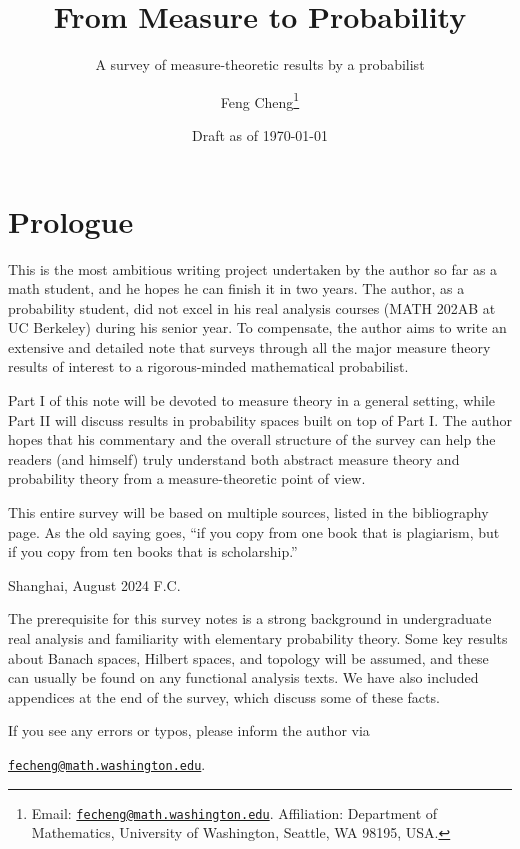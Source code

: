 \documentclass[10pt]{book}
\title{From Measure to Probability}
\subtitle{A survey of measure-theoretic results by a probabilist}
\author{Feng Cheng\thanks{Email: \href{mailto:fecheng@uw.edu}{\texttt{fecheng@math.washington.edu}}. Affiliation: Department of Mathematics, University of Washington, Seattle, WA 98195, USA.}}
\date{Draft as of \today}
\makeatletter
\numberwithin{equation}{chapter}
\theoremstyle{plain-star}
\theoremstyle{definition-star}
\theoremstyle{remark-star}
\theoremstyle{plain-star}
\let\@subtitle\@empty %
\renewcommand{\maketitle}{%
    \begin{titlepage}
    \renewcommand\thefootnote{\@fnsymbol\c@footnote}
    \let\footnotesize\small
    \let\footnoterule\relax
    \let \footnote \thanks
    \null\vfil
    \vskip 60\p@
    \begin{center}%
        {\LARGE \@title \par}%
        \vskip .5em%
        {\large \@subtitle \par}%
        \vskip 3em%
        {\large
        \lineskip .75em%
        \begin{tabular}[t]{c}%
            \@author
        \end{tabular}\par}%
        \vskip .75em%
        {\large \@date \par}%
    \end{center}\par
    \@thanks
    \vfil\null
    \end{titlepage}%
    \setcounter{footnote}{0}%
    \global\let\thanks\relax
    \global\let\maketitle\relax
    \global\let\@thanks\@empty
    \global\let\@author\@empty
    \global\let\@date\@empty
    \global\let\@title\@empty
    \global\let\title\relax
    \global\let\author\relax
    \global\let\date\relax
    \global\let\and\relax
}
\makeatother
\begin{document}
\maketitle

\tableofcontents
\newpage

\chapter*{\Large Prologue}

This is the most ambitious writing project undertaken by the author so far as a math student, and he hopes he can finish it in two years. The author, as a probability student, did not excel in his real analysis courses (MATH 202AB at UC Berkeley) during his senior year. To compensate, the author aims to write an extensive and detailed note that surveys through all the major measure theory results of interest to a rigorous-minded mathematical probabilist.

Part I of this note will be devoted to measure theory in a general setting, while Part II will discuss results in probability spaces built on top of Part I. The author hopes that his commentary and the overall structure of the survey can help the readers (and himself) truly understand both abstract measure theory and probability theory from a measure-theoretic point of view.

This entire survey will be based on multiple sources, listed in the bibliography page. As the old saying goes, ``if you copy from one book that is plagiarism, but if you copy from ten books that is scholarship.''
\vspace{1\baselineskip}

\noindent Shanghai, August 2024 \hfill F.C.

\vspace{3\baselineskip}
The prerequisite for this survey notes is a strong background in undergraduate real analysis and familiarity with elementary probability theory. Some key results about Banach spaces, Hilbert spaces, and topology will be assumed, and these can usually be found on any functional analysis texts. We have also included appendices at the end of the survey, which discuss some of these facts.

If you see any errors or typos, please inform the author via \begin{center}
    \href{mailto:fecheng@uw.edu}{\texttt{fecheng@math.washington.edu}}.
\end{center}
\newpage
\end{document}
